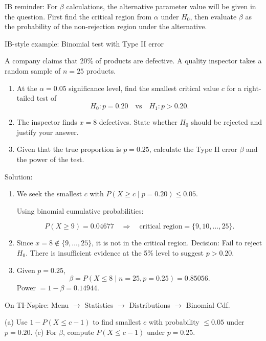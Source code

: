 \documentclass[11pt]{article}
\newcommand{\Hnull}{H_{0}}
\newcommand{\Halt}{H_{1}}
\def\textbf#1{#1}%
\def\texttt#1{#1}%
\newcounter{question}
\begin{document}
\begin{calctip}
\textbf{IB reminder:} For $\beta$ calculations, the alternative parameter value will be given in the question. First find the critical region from $\alpha$ under $H_0$, then evaluate $\beta$ as the probability of the non-rejection region under the alternative.
\end{calctip}

\newpage
\textbf{IB-style example: Binomial test with Type II error}

\begin{examplebox}
A company claims that $20\%$ of products are defective. A quality inspector takes a random sample of $n=25$ products.

\begin{enumerate}[label=(\alph*)]
  \item At the $\alpha = 0.05$ significance level, find the smallest critical value $c$ for a right-tailed test of
  \[
    \Hnull: p = 0.20 \quad \text{vs} \quad \Halt: p > 0.20.
  \]
  \item The inspector finds $x = 8$ defectives. State whether $H_0$ should be rejected and justify your answer.
  \item Given that the true proportion is $p = 0.25$, calculate the Type II error $\beta$ and the power of the test.
\end{enumerate}
\end{examplebox}

\textbf{Solution:}

\begin{enumerate}[label=(\alph*)]
  \item We seek the smallest $c$ with $P(X \ge c \mid p = 0.20) \le 0.05$.

  Using binomial cumulative probabilities:

  \[
    P(X \ge 9) = 0.04677 \quad\Rightarrow\quad \text{critical region} = \{9, 10, \dots, 25\}.
  \]
  \item Since $x = 8 \not\in \{9, \dots, 25\}$, it is not in the critical region.  
  \textbf{Decision:} Fail to reject $H_0$. There is insufficient evidence at the 5\% level to suggest $p > 0.20$.
  \item Given $p = 0.25$,
  \[
    \beta = P(X \le 8 \mid n = 25, p = 0.25) = 0.85056.
  \]
  \textbf{Power} $= 1 - \beta = 0.14944$.
\end{enumerate}

\begin{calctip}
On TI-Nspire: \texttt{Menu $\rightarrow$ Statistics $\rightarrow$ Distributions $\rightarrow$ Binomial Cdf}.

(a) Use $1 - P(X \le c-1)$ to find smallest $c$ with probability $\le 0.05$ under $p = 0.20$.  
(c) For $\beta$, compute $P(X \le c-1)$ under $p = 0.25$.
\end{calctip}
\end{document}
